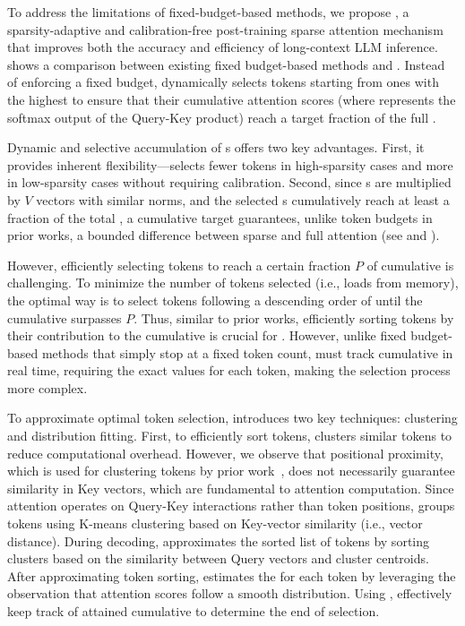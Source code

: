 To address the limitations of fixed-budget-based methods, we propose \sys, a sparsity-adaptive and
calibration-free post-training sparse attention mechanism that improves both the accuracy and efficiency of long-context LLM inference.  shows a comparison between existing fixed budget-based methods and \sys. Instead of enforcing a fixed budget, \sys dynamically selects tokens starting from ones with the highest \as{} to ensure that their cumulative attention scores (where \as{} represents the softmax output of the Query-Key product) reach a target fraction of the full \as{}. 





Dynamic and selective accumulation of \as{}s offers two key advantages. First, it provides inherent flexibility---\sys selects fewer tokens in high-sparsity cases and more in low-sparsity cases without requiring calibration. Second, since \as{}s are multiplied by \( V \) vectors with similar norms, and the selected \as{}s cumulatively reach at least a fraction of the total \as{}, a cumulative \as{} target guarantees, unlike token budgets in prior works, a bounded difference between sparse and full attention (see  and ).




However, efficiently selecting tokens to reach a certain fraction $P$ of cumulative \as{} is challenging. To minimize the number of tokens selected (i.e., loads from memory), the optimal way is to select tokens following a descending order of \as{} until the cumulative \as{} surpasses $P$. Thus, similar to prior works, efficiently sorting tokens by their contribution to the cumulative \as{} is crucial for \sys. However, unlike fixed budget-based methods that simply stop at a fixed token count, \sys must track cumulative \as{} in real time, requiring the exact \as{} values for each token, making the selection process more complex.



To approximate optimal token selection, \sys introduces two key techniques: clustering and distribution fitting. First, to efficiently sort tokens, \sys clusters similar tokens to reduce computational overhead. However, we observe that positional proximity, which is used for clustering tokens by prior work~\cite{tang2024questqueryawaresparsityefficient}, does not necessarily guarantee similarity in Key vectors, which are fundamental to attention computation. Since attention operates on Query-Key interactions rather than token positions, \sys groups tokens using K-means clustering based on Key-vector similarity (i.e., vector distance). During decoding, \sys approximates the sorted list of tokens by sorting clusters based on the similarity between Query vectors and cluster centroids. After approximating token sorting,  \sys estimates the \as{} for each token by leveraging the observation that attention scores follow a smooth distribution. Using \df, \sys effectively keep track of attained cumulative \as{} to determine the end of selection. 





